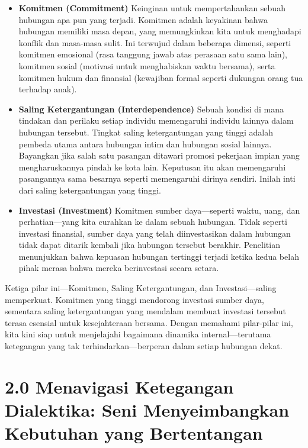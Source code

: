 \documentclass[
  letterpaper,
  DIV=11,
  numbers=noendperiod]{scrreprt}
\providecommand{\tightlist}{%
  \setlength{\itemsep}{0pt}\setlength{\parskip}{0pt}}
\begin{document}
\begin{itemize}
\tightlist
\item
  \textbf{Komitmen (Commitment)} Keinginan untuk mempertahankan sebuah
  hubungan apa pun yang terjadi. Komitmen adalah keyakinan bahwa
  hubungan memiliki masa depan, yang memungkinkan kita untuk menghadapi
  konflik dan masa-masa sulit. Ini terwujud dalam beberapa dimensi,
  seperti komitmen emosional (rasa tanggung jawab atas perasaan satu
  sama lain), komitmen sosial (motivasi untuk menghabiskan waktu
  bersama), serta komitmen hukum dan finansial (kewajiban formal seperti
  dukungan orang tua terhadap anak).
\item
  \textbf{Saling Ketergantungan (Interdependence)} Sebuah kondisi di
  mana tindakan dan perilaku setiap individu memengaruhi individu
  lainnya dalam hubungan tersebut. Tingkat saling ketergantungan yang
  tinggi adalah pembeda utama antara hubungan intim dan hubungan sosial
  lainnya. Bayangkan jika salah satu pasangan ditawari promosi pekerjaan
  impian yang mengharuskannya pindah ke kota lain. Keputusan itu akan
  memengaruhi pasangannya sama besarnya seperti memengaruhi dirinya
  sendiri. Inilah inti dari saling ketergantungan yang tinggi.
\item
  \textbf{Investasi (Investment)} Komitmen sumber daya---seperti waktu,
  uang, dan perhatian---yang kita curahkan ke dalam sebuah hubungan.
  Tidak seperti investasi finansial, sumber daya yang telah
  diinvestasikan dalam hubungan tidak dapat ditarik kembali jika
  hubungan tersebut berakhir. Penelitian menunjukkan bahwa kepuasan
  hubungan tertinggi terjadi ketika kedua belah pihak merasa bahwa
  mereka berinvestasi secara setara.
\end{itemize}

Ketiga pilar ini---Komitmen, Saling Ketergantungan, dan
Investasi---saling memperkuat. Komitmen yang tinggi mendorong investasi
sumber daya, sementara saling ketergantungan yang mendalam membuat
investasi tersebut terasa esensial untuk kesejahteraan bersama. Dengan
memahami pilar-pilar ini, kita kini siap untuk menjelajahi bagaimana
dinamika internal---terutama ketegangan yang tak terhindarkan---berperan
dalam setiap hubungan dekat.

\section{\texorpdfstring{\textbf{2.0 Menavigasi Ketegangan Dialektika:
Seni Menyeimbangkan Kebutuhan yang
Bertentangan}}{2.0 Menavigasi Ketegangan Dialektika: Seni Menyeimbangkan Kebutuhan yang Bertentangan}}\label{menavigasi-ketegangan-dialektika-seni-menyeimbangkan-kebutuhan-yang-bertentangan}
\end{document}
